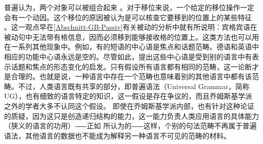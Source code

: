 普遍认为，两个对象可以被组合起来 \citep[]{Chomsky95a-u}。对于移位来说，一个给定的移位操作一定会有一个动因。这个移位的原因被认为是可以核查它要移到的位置上的某些特征
。这一观点早在\ref{Abschnitt-GB-Passiv}有关被动的分析中就有所说明：宾格宾语在被动句中无法带有格信息，因而必须移到能够接收格的位置上。这类方法也可以用在一系列其他现象中。例如，有的短语的中心语是焦点和话题范畴。德语和英语中相应的功能中心语永远是空的。尽管如此，提出这些中心语是受到别的语言中有表示话题和焦点的形态变化的启发。只有假设所有语言都有相同的范畴，这一论断才是合理的。也就是说，一种语言中存在一个范畴也意味着别的其他语言中都有该范畴。不过，人类语言既有共享的部分，即普遍语法（Universal Grammar，简称UG）\indexug，也有细致的语言特定的知识，这一假设是存在争议的，而且乔姆斯基学派之外的学者大多不认同这个假设。 即使在乔姆斯基学派内部，也有针对这种论证的质疑，因为这只是创造递归结构的能力，这一能力负责人类应用语言的具体能力（狭义的语言的功用）⸺正如 \citet*{HCF2002a}所认为的⸺这样，个别的句法范畴不再属于普遍语法，其他语言的数据也不能成为解释另一种语言不可见的范畴的材料。

